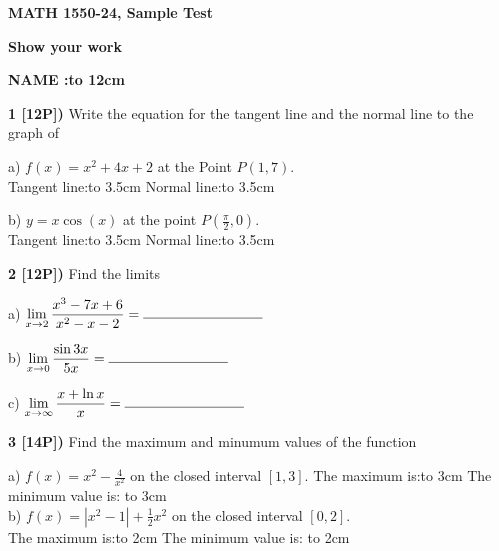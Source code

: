 \documentclass[12pt]{article}
\begin{document}
\centerline{\bf MATH 1550-24, Sample Test}%
\centerline{\bf Show your work}

\vspace{.25in}

{\large\bf NAME :\hbox to 12cm{\hrulefill}}


\vspace{.25in}

{\bf 1 [12P])} Write the equation for the tangent line and the
normal line to the graph of 

a) ${\displaystyle f(x) = x^2 + 4 x +2 
}$
at the Point $P(1,7)$. \\

Tangent line:\hbox to 3.5cm{\hrulefill}\hfill
Normal line:\hbox to 3.5cm{\hrulefill}\hfill


b)  $\displaystyle{y = x \cos (x)}$
at the point $P(\frac{\pi}{2},0)$.
\\ %
Tangent line:\hbox to 3.5cm{\hrulefill}\hspace{1.5cm}
Normal line:\hbox to 3.5cm{\hrulefill}\hfill
\\ %



\vspace{.25in}

{\bf 2 [12P])}  Find the limits

a) $\displaystyle{
\lim_{x\to 2}\frac{x^3 - 7x + 6}{x^2-x - 2}=
\hbox  to 3cm{\hrulefill}}$ 

\vspace{.25in}

b) ${\displaystyle \lim_{x\to 0}\frac{\sin 3x}{5x}=
\hbox to 3cm{\hrulefill}}$


c) ${\displaystyle \lim_{x\to \infty}\frac{x+\ln x}{x}=
\hbox to 3cm{\hrulefill}}$

\vspace{.25in}

{\bf 3 [14P])} Find the maximum and minumum values of
the function 

a) $\displaystyle{f(x) = x^2 - \frac{4}{x^2}}$ on the
closed interval $\displaystyle{[1,3]}$.
The maximum is:\hbox to 3cm{\hrulefill}\hspace{1.5cm}\hfill
The minimum value is: \hbox to 3cm{\hrulefill}
\\

b)
$\displaystyle{f(x) = |x^2-1| +\frac{1}{2}x^2}$ on the
closed interval $\displaystyle{[0,2]}$.
\\ %
The maximum is:\hbox to 2cm{\hrulefill}\hspace{1.5cm}
The minimum value is: \hbox to 2cm{\hrulefill}
\end{document}
